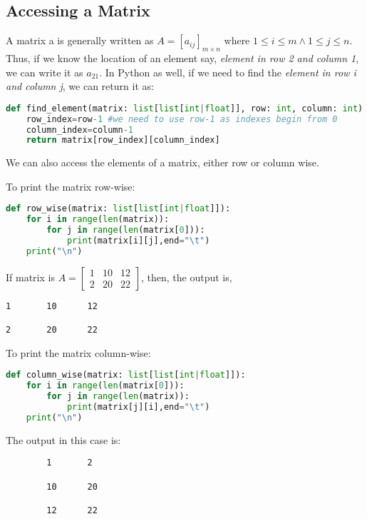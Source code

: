 \subsection{Accessing a Matrix}
A matrix a is generally written as $A=[a_{ij}]_{m\times n}$ where $1\leq i\leq m \land 1\leq j \leq n$. Thus, if we know the location of an element say, \emph{element in row 2 and column 1}, we can write it as $a_{21}$.
In Python as well, if we need to find the \emph{element in row i and column j}, we can return it as:
\begin{lstlisting}[language=Python, numbers=none]
def find_element(matrix: list[list[int|float]], row: int, column: int):
	row_index=row-1 #we need to use row-1 as indexes begin from 0
	column_index=column-1
	return matrix[row_index][column_index] \end{lstlisting}
\begin{eg}
	We can also access the elements of a matrix, either row or column wise.
\end{eg}
\begin{explanation}
	To print the matrix row-wise:
	\begin{lstlisting}[language=Python, numbers=none]
def row_wise(matrix: list[list[int|float]]):
	for i in range(len(matrix)):
		for j in range(len(matrix[0])):
			print(matrix[i][j],end="\t")
	print("\n") \end{lstlisting}
	If matrix is $A=\begin{bmatrix}
			1 & 10 & 12 \\
			2 & 20 & 22
		\end{bmatrix}$, then, the output is,
	\begin{verbatim}
1       10      12

2       20      22
	\end{verbatim}
	To print the matrix column-wise:
	\begin{lstlisting}[language=Python, numbers=none]
def column_wise(matrix: list[list[int|float]]):
	for i in range(len(matrix[0])):
		for j in range(len(matrix)):
			print(matrix[j][i],end="\t")
	print("\n") \end{lstlisting}
	The output in this case is:
	\begin{verbatim}
		1       2
		
		10      20
		
		12      22
	\end{verbatim}
\end{explanation}
